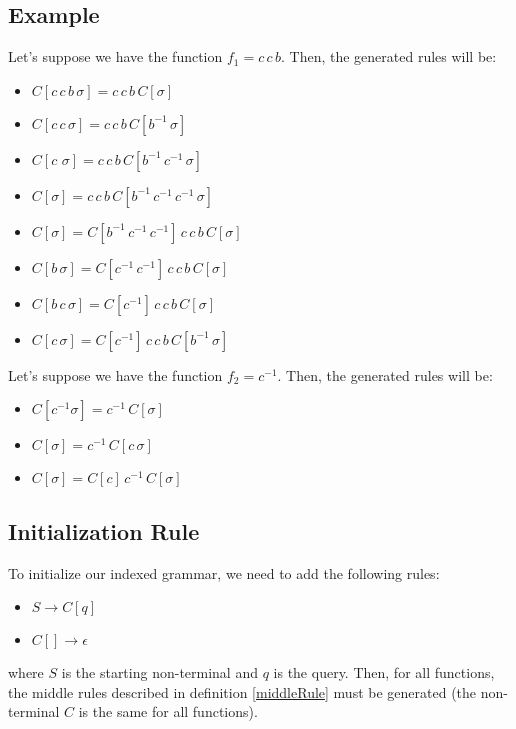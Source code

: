 
\subsection{Example}

Let's suppose we have the function $f_1 = c \, c \, b$. Then, the generated rules will be:
\begin{itemize}
\item $C[c \, c \, b \, \sigma] = c \, c \, b \, C[\sigma]$
\item $C[c \, c \, \sigma] = c \, c \, b \, C[b^{-1} \, \sigma]$
\item $C[c \, \, \sigma] = c \, c \, b \, C[b^{-1} \, c^{-1} \, \sigma]$
\item $C[\sigma] = c \, c \, b \, C[b^{-1} \, c^{-1} \, c^{-1} \, \sigma]$
\item $C[\sigma] = C[b^{-1} \, c^{-1} \, c^{-1}] \, c \, c \, b \, C[\sigma]$
\item $C[b \, \sigma] = C[c^{-1} \, c^{-1}]\,  c \, c \, b \, C[\sigma]$
\item $C[b \, c \, \sigma] = C[c^{-1}]\,  c \, c \, b \, C[\sigma]$
\item $C[c \, \sigma] = C[c^{-1}]\,  c \, c \, b \, C[b^{-1} \, \sigma]$
\end{itemize}

Let's suppose we have the function $f_2 = c^{-1}$. Then, the generated rules will be:
\begin{itemize}
\item $C[c^{-1} \sigma] = c^{-1} \, C[\sigma]$
\item $C[\sigma] = c^{-1} \, C[c \, \sigma]$
\item $C[\sigma] = C[c] \, c^{-1} \, C[\sigma]$
\end{itemize} 

\subsection{Initialization Rule}

To initialize our indexed grammar, we need to add the following rules:
\begin{itemize}
\item $S \rightarrow C[q]$
\item $C[] \rightarrow \epsilon$
\end{itemize}
where $S$ is the starting non-terminal and $q$ is the query.
Then, for all functions, the middle rules described in definition \ref{middleRule} must be generated (the non-terminal $C$ is the same for all functions).

